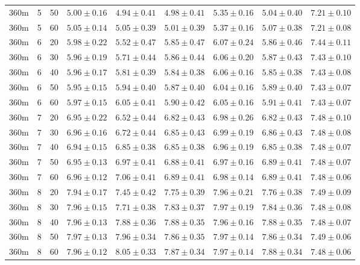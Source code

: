\begin{table}
\begin{center}
\begin{tabular}{ccc|c|ccccc}
  360m &   5 &  50 & $5.00 \pm 0.16$ & $4.94 \pm 0.41$ & $4.98 \pm 0.41$ & $5.35 \pm 0.16$ & $5.04 \pm 0.40$ & $7.21 \pm 0.10$ \\ 
  360m &   5 &  60 & $5.05 \pm 0.14$ & $5.05 \pm 0.39$ & $5.01 \pm 0.39$ & $5.37 \pm 0.16$ & $5.07 \pm 0.38$ & $7.21 \pm 0.08$ \\ 
   \hline
360m &   6 &  20 & $5.98 \pm 0.22$ & $5.52 \pm 0.47$ & $5.85 \pm 0.47$ & $6.07 \pm 0.24$ & $5.86 \pm 0.46$ & $7.44 \pm 0.11$ \\ 
  360m &   6 &  30 & $5.96 \pm 0.19$ & $5.71 \pm 0.44$ & $5.86 \pm 0.44$ & $6.06 \pm 0.20$ & $5.87 \pm 0.43$ & $7.43 \pm 0.10$ \\ 
  360m &   6 &  40 & $5.96 \pm 0.17$ & $5.81 \pm 0.39$ & $5.84 \pm 0.38$ & $6.06 \pm 0.16$ & $5.85 \pm 0.38$ & $7.43 \pm 0.08$ \\ 
  360m &   6 &  50 & $5.95 \pm 0.15$ & $5.94 \pm 0.40$ & $5.87 \pm 0.40$ & $6.04 \pm 0.16$ & $5.89 \pm 0.40$ & $7.43 \pm 0.07$ \\ 
  360m &   6 &  60 & $5.97 \pm 0.15$ & $6.05 \pm 0.41$ & $5.90 \pm 0.42$ & $6.05 \pm 0.16$ & $5.91 \pm 0.41$ & $7.43 \pm 0.07$ \\ 
   \hline
360m &   7 &  20 & $6.95 \pm 0.22$ & $6.52 \pm 0.44$ & $6.82 \pm 0.43$ & $6.98 \pm 0.26$ & $6.82 \pm 0.43$ & $7.48 \pm 0.10$ \\ 
  360m &   7 &  30 & $6.96 \pm 0.16$ & $6.72 \pm 0.44$ & $6.85 \pm 0.43$ & $6.99 \pm 0.19$ & $6.86 \pm 0.43$ & $7.48 \pm 0.08$ \\ 
  360m &   7 &  40 & $6.94 \pm 0.15$ & $6.85 \pm 0.38$ & $6.85 \pm 0.38$ & $6.96 \pm 0.19$ & $6.85 \pm 0.38$ & $7.48 \pm 0.07$ \\ 
  360m &   7 &  50 & $6.95 \pm 0.13$ & $6.97 \pm 0.41$ & $6.88 \pm 0.41$ & $6.97 \pm 0.16$ & $6.89 \pm 0.41$ & $7.48 \pm 0.07$ \\ 
  360m &   7 &  60 & $6.96 \pm 0.12$ & $7.06 \pm 0.41$ & $6.89 \pm 0.41$ & $6.98 \pm 0.14$ & $6.89 \pm 0.41$ & $7.48 \pm 0.06$ \\ 
   \hline
360m &   8 &  20 & $7.94 \pm 0.17$ & $7.45 \pm 0.42$ & $7.75 \pm 0.39$ & $7.96 \pm 0.21$ & $7.76 \pm 0.38$ & $7.49 \pm 0.09$ \\ 
  360m &   8 &  30 & $7.96 \pm 0.15$ & $7.71 \pm 0.38$ & $7.83 \pm 0.37$ & $7.97 \pm 0.19$ & $7.84 \pm 0.36$ & $7.48 \pm 0.08$ \\ 
  360m &   8 &  40 & $7.96 \pm 0.13$ & $7.88 \pm 0.36$ & $7.88 \pm 0.35$ & $7.96 \pm 0.16$ & $7.88 \pm 0.35$ & $7.48 \pm 0.07$ \\ 
  360m &   8 &  50 & $7.97 \pm 0.13$ & $7.96 \pm 0.34$ & $7.86 \pm 0.35$ & $7.97 \pm 0.14$ & $7.86 \pm 0.34$ & $7.49 \pm 0.06$ \\ 
  360m &   8 &  60 & $7.96 \pm 0.12$ & $8.05 \pm 0.33$ & $7.87 \pm 0.34$ & $7.97 \pm 0.14$ & $7.88 \pm 0.34$ & $7.48 \pm 0.06$ \\ 
   \hline
\end{tabular}
\end{center}
\end{table}

